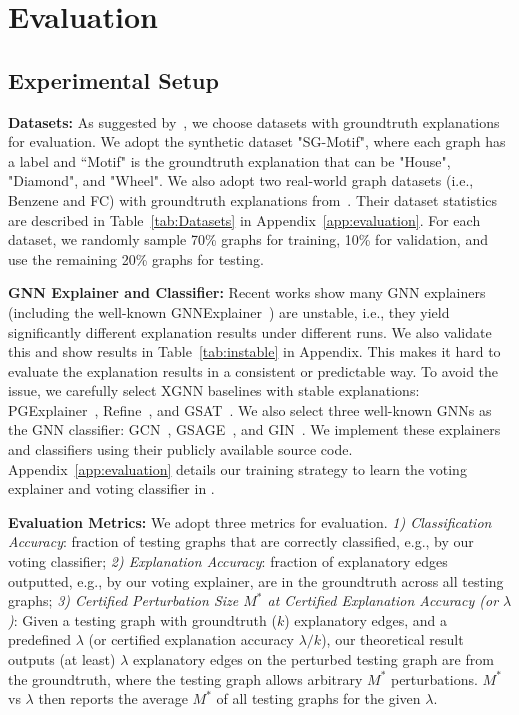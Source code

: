 \section{Evaluation}
\label{sec:eval}
\vspace{-2mm}

\subsection{Experimental Setup}
\vspace{-2mm}

{\bf Datasets:} 
As suggested by~\citep{agarwal2023evaluating}, we choose datasets with groundtruth explanations for evaluation. 
We adopt the synthetic dataset "SG-Motif", where each graph has a label and ``Motif" is the groundtruth explanation that can be "House", "Diamond", and "Wheel".
We also adopt two real-world graph datasets (i.e., Benzene and FC) with groundtruth explanations from~\cite{agarwal2023evaluating}. 
Their dataset statistics are described in Table~\ref{tab:Datasets} in Appendix~\ref{app:evaluation}.
For each dataset, we randomly sample 70\% graphs for training, 10\% for validation, and use the remaining 20\% graphs for testing. 

{\bf GNN Explainer and Classifier:}
Recent works \citep{funke2022zorro,agarwal2023evaluating} show many GNN explainers (including the well-known GNNExplainer~\cite{GNNEx19}) are unstable, i.e., they yield significantly different explanation results under different runs. We also validate this and show results in Table~\ref{tab:instable} in Appendix. This makes it hard to evaluate the explanation results in a consistent or predictable way. To avoid the issue, we carefully select XGNN baselines with stable explanations: PGExplainer~\citep{DBLP:journals/corr/abs-2011-04573/PGExplainer}, Refine~\citep{wang2021towards}, and GSAT~\citep{DBLP:journals/corr/abs-2201-12987/GSAT}. We also select three well-known GNNs as the GNN classifier: GCN~\citep{kipf2017semi}, GSAGE~\citep{hamilton2017inductive}, and GIN~\citep{xu2018how}.  
We implement  these explainers and classifiers using their publicly available source code. 
Appendix~\ref{app:evaluation} details our training strategy to learn the voting explainer and voting classifier in {\name}. 

{\bf Evaluation Metrics:} We adopt three metrics for evaluation.  
\emph{1) Classification Accuracy}: fraction of testing graphs that are correctly classified, e.g., by our voting classifier; \emph{2) Explanation Accuracy}: fraction of explanatory edges outputted, e.g., by our voting  explainer, are in the groundtruth across all testing graphs; 
\emph{3) Certified Perturbation Size  $M^*$ at Certified Explanation Accuracy (or $\lambda$)}: 
Given a testing graph with groundtruth ($k$) explanatory edges, and a predefined $\lambda$ (or certified explanation accuracy $\lambda/k$), our theoretical result outputs (at least) $\lambda$ explanatory edges on the perturbed testing graph are from the groundtruth, where the testing graph allows arbitrary {$M^*$} perturbations.  
{$M^*$ vs  $\lambda$} then reports the average {$M^*$} of all testing graphs for the given $\lambda$. 

